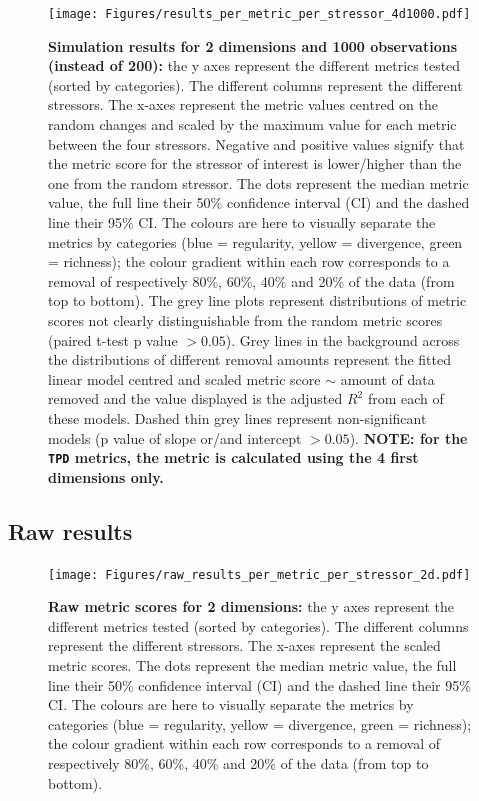 \documentclass[12pt,letterpaper]{article}
\begin{document}
\begin{figure}[!htbp]
\centering
   \texttt{[image: Figures/results\_per\_metric\_per\_stressor\_4d1000.pdf]}
\caption{\scriptsize{\textbf{Simulation results for 2 dimensions and 1000 observations (instead of 200):} the y axes represent the different metrics tested (sorted by categories).
The different columns represent the different stressors. The x-axes represent the metric values centred on the random changes and scaled by the maximum value for each metric between the four stressors.
Negative and positive values signify that the metric score for the stressor of interest is lower/higher than the one from the random stressor.
The dots represent the median metric value, the full line their 50\% confidence interval (CI) and the dashed line their 95\% CI.
The colours are here to visually separate the metrics by categories (blue = regularity, yellow = divergence, green = richness); the colour gradient within each row corresponds to a removal of respectively 80\%, 60\%, 40\% and 20\% of the data (from top to bottom).
The grey line plots represent distributions of metric scores not clearly distinguishable from the random metric scores (paired t-test p value $> 0.05$).
Grey lines in the background across the distributions of different removal amounts represent the fitted linear model centred and scaled metric score $\sim$ amount of data removed and the value displayed is the adjusted $R^2$ from each of these models.
Dashed thin grey lines represent non-significant models (p value of slope or/and intercept $> 0.05$).
\textbf{NOTE: for the \texttt{TPD} metrics, the metric is calculated using the 4 first dimensions only.}
}}
\label{Fig:simulation_results_4d1000}
\end{figure}
\bigskip


\subsection{Raw results}

\begin{figure}[!htbp]
\centering
   \texttt{[image: Figures/raw\_results\_per\_metric\_per\_stressor\_2d.pdf]}
\caption{\scriptsize{\textbf{Raw metric scores for 2 dimensions:} the y axes represent the different metrics tested (sorted by categories).
The different columns represent the different stressors.
The x-axes represent the scaled metric scores.
The dots represent the median metric value, the full line their 50\% confidence interval (CI) and the dashed line their 95\% CI.
The colours are here to visually separate the metrics by categories (blue = regularity, yellow = divergence, green = richness); the colour gradient within each row corresponds to a removal of respectively 80\%, 60\%, 40\% and 20\% of the data (from top to bottom).
}}
\label{Fig:raw_results_2d}
\end{figure}
\bigskip
\end{document}

